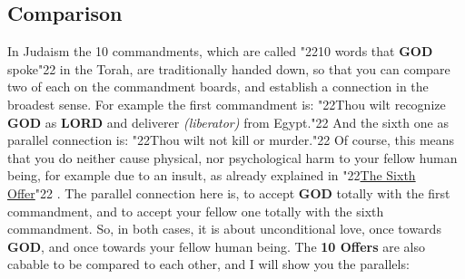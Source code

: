 \documentclass[10pt,a5paper]{article}
\newcommand{\God}[0]{\textbf{GOD}}
\newcommand{\Lord}[0]{\textbf{LORD}}
\newcommand{\q}[1]{\char"22{#1}\char"22 }
\begin{document}
	\subsection{Comparison}
		In Judaism the 10 commandments,
		which are called \q{10 words that {\God} spoke} in the Torah,
		are traditionally handed down,
		so that you can compare two of each on the commandment boards,
		and establish a connection in the broadest sense.
		For example the first commandment is:
		\q{Thou wilt recognize {\God} as {\Lord} and deliverer \textit{(liberator)} from Egypt.}
		And the sixth one as parallel connection is:
		\q{Thou wilt not kill or murder.}
		Of course,
		this means that you do neither cause physical,
		nor psychological harm to your fellow human being,
		for example due to an insult,
		as already explained in \q{\hyperref[TheSixthOffer]{The Sixth Offer}}.
		The parallel connection here is,
		to accept {\God} totally with the first commandment,
		and to accept your fellow one totally with the sixth commandment.
		So,
		in both cases,
		it is about unconditional love,
		once towards {\God},
		and once towards your fellow human being.
		The \textbf{10 Offers} are also cabable to be compared to each other,
		and I will show you the parallels:
		\\
\end{document}
